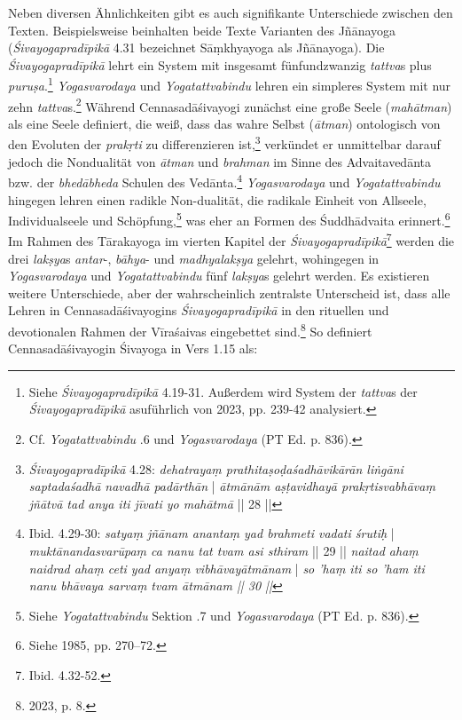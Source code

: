 Neben diversen Ähnlichkeiten gibt es auch signifikante Unterschiede zwischen den Texten. Beispielsweise beinhalten beide Texte Varianten des Jñānayoga (\textit{Śivayogapradīpikā} 4.31 bezeichnet Sāṃkhyayoga als Jñānayoga). Die \textit{Śivayogapradīpikā} lehrt ein System mit insgesamt fünfundzwanzig \textit{tattva}s plus \textit{puruṣa}.\footnote{Siehe \textit{Śivayogapradīpikā} 4.19-31. Außerdem wird System der \textit{tattva}s der \textit{Śivayogapradīpikā} asuführlich von \citeauthor{powell2023} 2023, pp. 239-42 analysiert.} \textit{Yogasvarodaya} und \textit{Yogatattvabindu} lehren ein simpleres System mit nur zehn \textit{tattva}s.\footnote{Cf. \textit{Yogatattvabindu} .6 und \textit{Yogasvarodaya} (PT Ed. p. 836).} Während Cennasadāśivayogi zunächst eine große Seele (\textit{mahātman}) als eine Seele definiert, die weiß, dass das wahre Selbst (\textit{ātman}) ontologisch von den Evoluten der \textit{prakṛti} zu differenzieren ist,\footnote{\textit{Śivayogapradīpikā} 4.28: \textit{dehatrayaṃ prathitaṣoḍaśadhāvikārān liṅgāni saptadaśadhā navadhā padārthān} | \textit{ātmānām aṣṭavidhayā prakṛtisvabhāvaṃ jñātvā tad anya iti jīvati yo mahātmā} || 28 ||} verkündet er unmittelbar darauf jedoch die Nondualität von \textit{ātman} und \textit{brahman} im Sinne des Advaitavedānta bzw. der \textit{bhedābheda} Schulen des Vedānta.\footnote{Ibid. 4.29-30: \textit{satyaṃ jñānam anantaṃ yad brahmeti vadati śrutiḥ} | \textit{muktānandasvarūpaṃ ca nanu tat tvam asi sthiram} || 29 || \textit{naitad ahaṃ naidrad ahaṃ ceti yad anyaṃ vibhāvayātmānam} | \textit{so 'haṃ iti so 'ham iti nanu bhāvaya sarvaṃ tvam ātmānam || 30 ||}} \textit{Yogasvarodaya} und \textit{Yogatattvabindu} hingegen lehren einen radikle Non-dualität, die radikale Einheit von Allseele, Individualseele und Schöpfung,\footnote{Siehe \textit{Yogatattvabindu} Sektion .7 und \textit{Yogasvarodaya} (PT Ed. p. 836).} was eher an Formen des Śuddhādvaita erinnert.\footnote{Siehe \citeauthor{glasenapp1949philosophie} 1985, pp. 270–72.}
 Im Rahmen des Tārakayoga im vierten Kapitel der \textit{Śivayogapradīpikā}\footnote{Ibid. 4.32-52.} werden die drei \textit{lakṣya}s \textit{antar}-, \textit{bāhya}- und \textit{madhyalakṣya} gelehrt, wohingegen in \textit{Yogasvarodaya} und \textit{Yogatattvabindu} fünf \textit{lakṣya}s gelehrt werden.
Es existieren weitere Unterschiede, aber der wahrscheinlich zentralste Unterscheid ist, dass alle Lehren in Cennasadāśivayogins \textit{Śivayogapradīpikā} in den rituellen und devotionalen Rahmen der Vīraśaivas eingebettet sind.\footnote{\citeauthor{powell2023} 2023, p. 8.} So definiert Cennasadāśivayogin Śivayoga in Vers 1.15 als:
